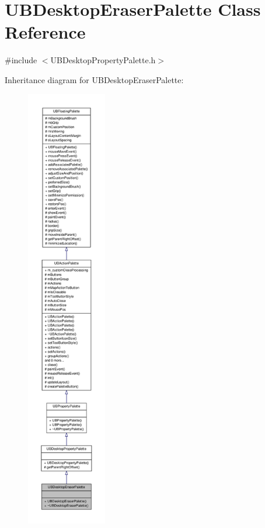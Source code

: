 \hypertarget{class_u_b_desktop_eraser_palette}{\section{U\-B\-Desktop\-Eraser\-Palette Class Reference}
\label{d5/d5e/class_u_b_desktop_eraser_palette}
}


{\ttfamily \#include $<$U\-B\-Desktop\-Property\-Palette.\-h$>$}



Inheritance diagram for U\-B\-Desktop\-Eraser\-Palette\-:
\nopagebreak
\begin{figure}[H]
\begin{center}
\leavevmode
\includegraphics[height=550pt]{d0/d4b/class_u_b_desktop_eraser_palette__inherit__graph}
\end{center}
\end{figure}


